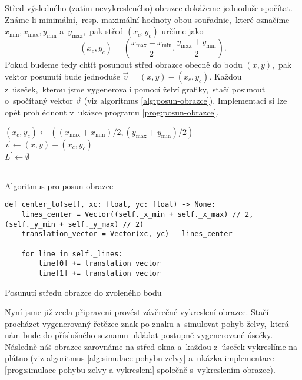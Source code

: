 Střed výsledného (zatím nevykresleného) obrazce dokážeme jednoduše spočítat. Známe-li minimální,~resp. maximální hodnoty obou souřadnic,~které označíme $x_{\text{min}},x_{\text{max}},y_{\text{min}}$ a~$y_{\text{max}}$,~pak střed $(x_c,y_c)$ určíme jako
\[(x_c,y_c)=\left(\dfrac{x_{\text{max}}+x_{\text{min}}}{2},\dfrac{y_{\text{max}}+y_{\text{min}}}{2}\right).\]
Pokud budeme tedy chtít posunout střed obrazce obecně do bodu $(x,y)$,~pak vektor posunutí bude jednoduše $\vec{v}=(x,y)-(x_c,y_c)$. Každou z~úseček,~kterou jsme vygenerovali pomocí želví grafiky,~stačí posunout o~spočítaný vektor $\vec{v}$ (viz algoritmus \ref{alg:posun-obrazce}). Implementaci si lze opět prohlédnout v~ukázce programu \ref{prog:posun-obrazce}.
\begin{algorithm}[h]
    $(x_c,y_c)\gets((x_{\text{max}}+x_{\text{min}})/2,(y_{\text{max}}+y_{\text{min}})/2)$\\
    $\vec{v}\gets(x,y)-(x_c,y_c)$\\
    $L^\prime\gets\emptyset$\\
    \\
    \caption{Algoritmus pro posun obrazce}
    \label{alg:posun-obrazce}
\end{algorithm}
\begin{program}[h]
\begin{lstlisting}[style=python]
def center_to(self, xc: float, yc: float) -> None:
    lines_center = Vector((self._x_min + self._x_max) // 2, (self._y_min + self._y_max) // 2)
    translation_vector = Vector(xc, yc) - lines_center

    for line in self._lines:
        line[0] += translation_vector
        line[1] += translation_vector
\end{lstlisting}
    \caption{Posunutí středu obrazce do zvoleného bodu}
    \label{prog:posun-obrazce}
\end{program}
Nyní jsme již zcela připraveni provést závěrečné vykreslení obrazce. Stačí procházet vygenerovaný řetězec znak po znaku a~simulovat pohyb želvy,~která nám bude do příslušného seznamu ukládat postupně vygenerované úsečky. Následně náš obrazec zarovnáme na střed okna a~každou z~úseček vykreslíme na plátno (viz algoritmus \ref{alg:simulace-pohybu-zelvy} a~ukázka implementace \ref{prog:simulace-pohybu-zelvy-a-vykresleni} společně s~vykreslením obrazce).
